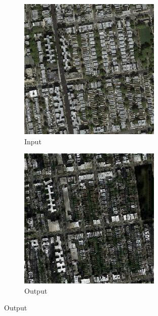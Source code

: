 \begin{figure}[ht]
\begin{subfigure}[t]{.14\textwidth}
  \end{subfigure}
  \hfill
  \begin{subfigure}[t]{.14\textwidth}
    \centering
    \caption*{Input}
    \includegraphics[width=\linewidth]{images/cycleGanResults/Satelite19_Or_Ld120_E100_Lr0002.jpg}
  \end{subfigure}
  \begin{subfigure}[t]{.14\textwidth}
    \centering
    \caption*{Output}
    \includegraphics[width=\linewidth]{images/cycleGanResults/Satelite19Ld120_E100_Lr0002.jpg}

\end{subfigure}
\end{figure}
